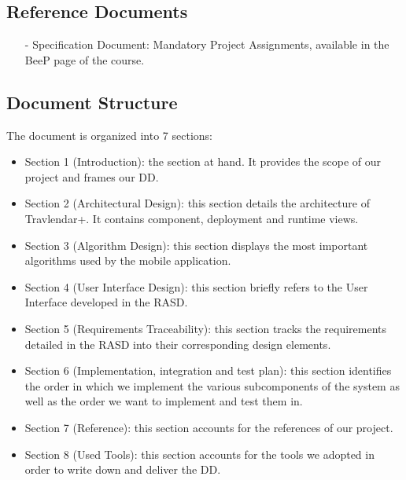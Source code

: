 \subsection{Reference Documents}
\begin{itemize}
		\item[-] \textsf{Specification Document: Mandatory Project Assignments}, available in the BeeP page of the course.
\end{itemize} 

\subsection{Document Structure}
The document is organized into 7 sections:

\begin{itemize}
	\item Section 1  (Introduction): the section at hand. It provides the scope of our project and frames our DD.
	\item Section 2 (Architectural Design): this section details the architecture of Travlendar+. It contains component, deployment and runtime views.
	\item Section 3 (Algorithm Design): this section displays the most important algorithms used by the mobile application.
	\item Section 4 (User Interface Design): this section briefly refers to the User Interface developed in the RASD.
	\item Section 5 (Requirements Traceability): this section tracks the requirements detailed in the RASD into their corresponding design elements.
	\item Section 6 (Implementation, integration and test plan): this section identifies the order in which we implement the various subcomponents of the system as well as the order we want to implement and test them in.
	\item Section  7 (Reference): this section accounts for the references of our project.
	\item Section 8 (Used Tools): this section accounts for the tools we adopted in order to write down and deliver the DD.
\end{itemize}